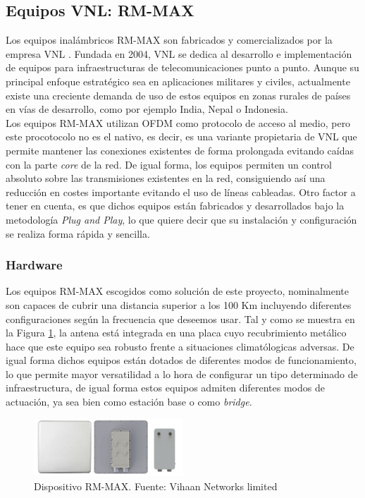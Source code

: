 \subsection{Equipos VNL: RM-MAX}
Los equipos inalámbricos RM-MAX son fabricados y comercializados por la empresa VNL \cite{VNL}. Fundada en 2004, VNL se dedica al desarrollo e implementación de equipos para infraestructuras de telecomunicaciones punto a punto. Aunque su principal enfoque estratégico sea en aplicaciones militares y civiles, actualmente existe una creciente demanda de uso de estos equipos en zonas rurales de países en vías de desarrollo, como por ejemplo India, Nepal o Indonesia.\\

Los equipos RM-MAX  utilizan OFDM como protocolo de acceso al medio, pero este procotocolo no es el nativo, es decir, es una variante propietaria de VNL que permite mantener las conexiones existentes de forma prolongada evitando caídas con la parte \textit{core} de la red. De igual forma, los equipos permiten un control absoluto sobre las transmisiones existentes en la red, consiguiendo así una reducción en costes importante evitando el uso de líneas cableadas. Otro factor a tener en cuenta, es que dichos equipos están fabricados y desarrollados bajo la metodología \textit{Plug and Play}, lo que quiere decir que su instalación y configuración se realiza forma rápida y sencilla.

\subsubsection{Hardware}
Los equipos RM-MAX escogidos como solución de este proyecto, nominalmente son capaces de cubrir una distancia superior a los 100 Km incluyendo diferentes configuraciones según la frecuencia que deseemos usar. Tal y como se muestra en la Figura \ref{rm_max}, la antena está integrada en una placa cuyo recubrimiento metálico hace que este equipo sea robusto frente a situaciones climatólogicas adversas. De igual forma dichos equipos están dotados de diferentes modos de funcionamiento, lo que permite mayor versatilidad a lo hora de configurar un tipo determinado de infraestructura, de igual forma estos equipos admiten diferentes modos de actuación, ya sea bien como estación base o como \textit{bridge}.

\begin{figure}[H]
		\centering
		\includegraphics[width=0.5\textwidth]{img/rm_max.JPG}
		\caption{Dispositivo RM-MAX. Fuente: Vihaan Networks limited}
		\label{rm_max}
	\end{figure}
	
